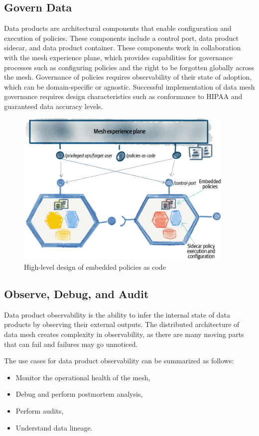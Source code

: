 \documentclass[12pt, a4paper]{book}
\begin{document}
\subsection{Govern Data}
Data products are architectural components that enable configuration and execution of policies. These components include a control port, data product sidecar, and data product container. These components work in collaboration with the mesh experience plane, which provides capabilities for governance processes such as configuring policies and the right to be forgotten globally across the mesh. Governance of policies requires observability of their state of adoption, which can be domain-specific or agnostic. Successful implementation of data mesh governance requires design characteristics such as conformance to HIPAA and guaranteed data accuracy levels.

\begin{figure}[h]
	\begin{framed}
		\centering
		\includegraphics[width=10.5cm]{GovernData.png}
		\caption{High-level design of embedded policies as code}
		\label{GovernData}
	\end{framed}
	\vspace{-.8cm}
\end{figure}

\subsection{Observe, Debug, and Audit}
Data product observability is the ability to infer the internal state of data products by observing their external outputs. The distributed architecture of data mesh creates complexity in observability, as there are many moving parts that can fail and failures may go unnoticed.

The use cases for data product observability can be summarized as follows:
	\begin{itemize}[nosep]
		\item Monitor the operational health of the mesh,
		\item Debug and perform postmortem analysis,
		\item Perform audits,
		\item Understand data lineage.
	\end{itemize}
\end{document}
